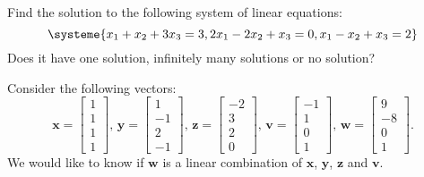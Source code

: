 \documentclass[addpoints, 12pt]{exam}%
\theoremstyle{definition}
\begin{document}
\begin{questions}

\question[10]

Find the solution to the following system of linear equations:
  \[
    \systeme{x_1 + x_2 + 3x_3 = 3, 2x_1 - 2x_2 + x_3 = 0, x_1 - x_2 + x_3 = 2} 
  \]
Does it have one solution, infinitely many solutions or no solution?

\newpage 

\question

Consider the following vectors:
  \[
    \mathbf{x} = \begin{bmatrix} 1 \\ 1 \\ 1 \\ 1 \end{bmatrix} , \, \mathbf{y} = \begin{bmatrix} 1 \\ -1 \\ 2 \\ -1 \end{bmatrix} , \, \mathbf{z} = \begin{bmatrix} -2 \\ 3 \\ 2 \\ 0 \end{bmatrix} , \, \mathbf{v} = \begin{bmatrix} -1 \\ 1 \\ 0 \\ 1 \end{bmatrix} , \, \mathbf{w} = \begin{bmatrix} 9 \\ -8 \\ 0 \\ 1 \end{bmatrix} .
  \]
We would like to know if $\mathbf{w}$ is a linear combination of $\mathbf{x}$, $\mathbf{y}$, $\mathbf{z}$ and $\mathbf{v}$.

\end{questions}
\end{document}
